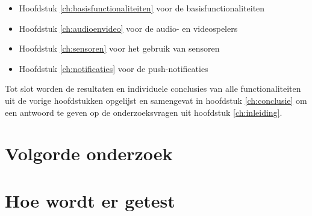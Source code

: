 \begin{itemize}
    \item Hoofdstuk \ref{ch:basisfunctionaliteiten} voor de basisfunctionaliteiten
    \item Hoofdstuk \ref{ch:audioenvideo} voor de audio- en videospelers
    \item Hoofdstuk \ref{ch:sensoren} voor het gebruik van sensoren
    \item Hoofdstuk \ref{ch:notificaties} voor de push-notificaties
\end{itemize}
Tot slot worden de resultaten en individuele conclusies van alle 
functionaliteiten uit de vorige hoofdstukken opgelijst en samengevat in hoofdstuk 
\ref{ch:conclusie} om een antwoord te geven op de onderzoeksvragen uit 
hoofdstuk \ref{ch:inleiding}.

\section{Volgorde onderzoek}



\section{Hoe wordt er getest}





